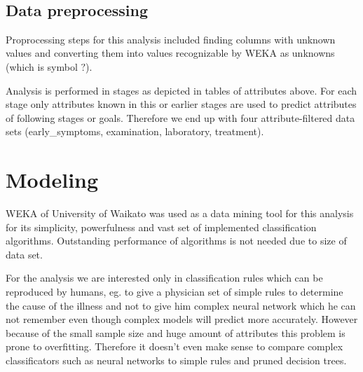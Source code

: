 \documentclass[11pt]{article}
\begin{document}
\mbox{}\\
\begin{table}[h]
\caption*{\bf Attributes after beginning of treatment}
\label{tab:attrs_treatment}
\end{table}

\subsection{Data preprocessing}
Proprocessing steps for this analysis included finding columns with unknown
values and converting them into values recognizable by WEKA as unknowns (which
is symbol $?$).

Analysis is performed in stages as depicted in tables of attributes above.  For
each stage only attributes known in this or earlier stages are used to predict
attributes of following stages or goals. Therefore we end up with four
attribute-filtered data sets (early\_symptoms, examination, laboratory, treatment).

\section{Modeling}
WEKA of University of Waikato was used as a data mining tool for this analysis
for its simplicity, powerfulness and vast set of implemented classification
algorithms. Outstanding performance of algorithms is not needed due to size of
data set.

For the analysis we are interested only in classification rules which can be
reproduced by humans, eg.  to give a physician set of simple rules to determine
the cause of the illness and not to give him complex neural network which he
can not remember even though complex models will predict more accurately.
However because of the small sample size and huge amount of attributes this
problem is prone to overfitting. Therefore it doesn't even make sense to
compare complex classificators such as neural networks to simple rules and
pruned decision trees.
\end{document}
